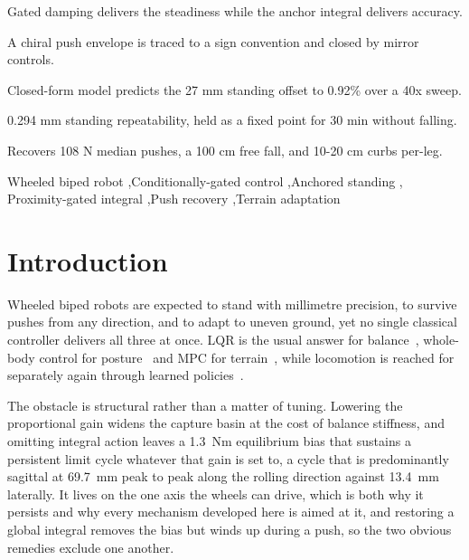 \documentclass[a4paper,fleqn]{cas-dc}
\begin{document}
\begin{highlights}
\item Gated damping delivers the steadiness while the anchor integral delivers accuracy.
\item A chiral push envelope is traced to a sign convention and closed by mirror controls.
\item Closed-form model predicts the 27 mm standing offset to 0.92\% over a 40x sweep.
\item 0.294 mm standing repeatability, held as a fixed point for 30 min without falling.
\item Recovers 108 N median pushes, a 100 cm free fall, and 10-20 cm curbs per-leg.
\end{highlights}

\begin{keywords}
Wheeled biped robot \sep Conditionally-gated control \sep Anchored standing \sep
Proximity-gated integral \sep Push recovery \sep Terrain adaptation
\end{keywords}

\maketitle

\printcredits

\section{Introduction}
\label{sec:intro}

Wheeled biped robots are expected to stand with millimetre precision, to survive
pushes from any direction, and to adapt to uneven ground, yet no single
classical controller delivers all three at once. LQR is the usual answer for
balance~\cite{klemm2019ascento}, whole-body control for
posture~\cite{klemm2020lqrwbc} and MPC for terrain~\cite{skater2024}, while
locomotion is reached for separately again through learned
policies~\cite{hwangbo2019rl}.

The obstacle is structural rather than a matter of tuning. Lowering the
proportional gain widens the capture basin at the cost of balance stiffness, and
omitting integral action leaves a \SI{1.3}{Nm} equilibrium bias that sustains a
persistent limit cycle whatever that gain is set to, a cycle that is
predominantly sagittal at \SI{69.7}{mm} peak to peak along the rolling direction
against \SI{13.4}{mm} laterally. It lives on the one axis the wheels can drive,
which is both why it persists and why every mechanism developed here is aimed at
it, and restoring a global integral removes the bias but winds up during a push,
so the two obvious remedies exclude one another.
\end{document}
